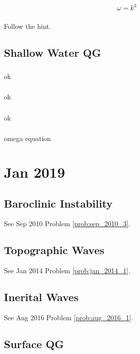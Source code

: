 \documentclass[11pt,letterpaper]{book}
\theoremstyle{definition}
\begin{document}
\subsection{}
$$\omega = k^3$$

\subsection{}
Follow the hint.

\section{Shallow Water QG}
\subsection{}
ok

\subsection{}
ok

\subsection{}
ok

\subsection{}
omega equation

\chapter{Jan 2019}
\section{Baroclinic Instability}
See Sep 2010 Problem \ref{prob:sep_2010_3}.

\section{Topographic Waves}
See Jan 2014 Problem \ref{prob:jan_2014_1}.

\section{Inerital Waves}
See Aug 2016 Problem \ref{prob:aug_2016_1}.

\section{Surface QG}
\end{document}
